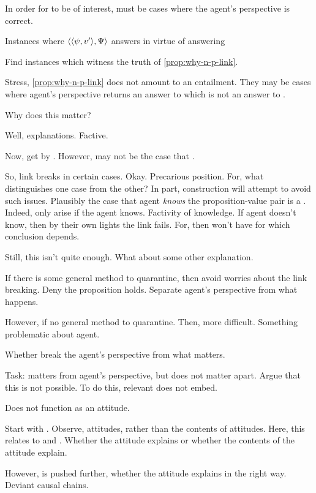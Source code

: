 \begin{note}
  In order for \qWhyV{} to be of interest, must be cases where the agent's perspective is correct.

  \begin{proposition}
    \label{prop:why-n-p-link}
    Instances where \(\langle \langle \psi, v' \rangle, \Psi \rangle\) answers \qWhyVnP{} in virtue of answering \qWhyV{}
  \end{proposition}

  Find instances which witness the truth of \autoref{prop:why-n-p-link}.

  Stress, \autoref{prop:why-n-p-link} does not amount to an entailment.
  They may be cases where agent's perspective returns an answer to \qWhyV{} which is not an answer to \qWhyVnP{}.
\end{note}

\begin{note}
  Why does this matter?

  Well, explanations.
  Factive.

  Now, get \ros{} by \fc{}.
  However, may not be the case that \fc{}.

  So, link breaks in certain cases.
  Okay.
  Precarious position.
  For, what distinguishes one case from the other?
  In part, construction will attempt to avoid such issues.
  Plausibly the case that agent \emph{knows} the proposition-value pair is a \fc{}.
  Indeed, only arise if the agent knows.
  Factivity of knowledge.
  If agent doesn't know, then by their own lights the link fails.
  For, then won't have \fc{} for which conclusion depends.

  Still, this isn't quite enough.
  What about some other explanation.

  If there is some general method to quarantine, then avoid worries about the link breaking.
  Deny the proposition holds.
  Separate agent's perspective from what happens.

  However, if no general method to quarantine.
  Then, more difficult.
  Something problematic about agent.

  Whether break the agent's perspective from what matters.

  Task: \fc{} matters from agent's perspective, but does not matter apart.
  Argue that this is not possible.
  To do this, relevant \fc{} does not embed.

  Does not function as an attitude.
\end{note}

\begin{note}
  Start with \citeauthor{Davidson:1963aa}.
  Observe, attitudes, rather than the contents of attitudes.
  Here, this relates to \citeauthor{Dancy:2000aa} and \citeauthor{Collins:1997wn}.
  Whether the attitude explains or whether the contents of the attitude explain.

  However, \citeauthor{Davidson:1963aa} is pushed further, whether the attitude explains in the right way.
  Deviant causal chains.
\end{note}

